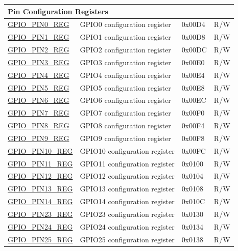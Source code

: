 \begin{longtable}{ | p{5.5cm} | p{7cm} | p{1.3cm} | p{1.9cm} | }
\multicolumn{4}{|l|}{\textbf{Pin Configuration Registers}} \\ \hline
\hyperref[regdesc:GPIOPINNREG]{GPIO\_PIN0\_REG} & GPIO0 configuration register & 0x00D4 & R/W \\ \hline
\hyperref[regdesc:GPIOPINNREG]{GPIO\_PIN1\_REG} & GPIO1 configuration register & 0x00D8 & R/W \\ \hline
\hyperref[regdesc:GPIOPINNREG]{GPIO\_PIN2\_REG} & GPIO2 configuration register & 0x00DC & R/W \\ \hline
\hyperref[regdesc:GPIOPINNREG]{GPIO\_PIN3\_REG} & GPIO3 configuration register & 0x00E0 & R/W \\ \hline
\hyperref[regdesc:GPIOPINNREG]{GPIO\_PIN4\_REG} & GPIO4 configuration register & 0x00E4 & R/W \\ \hline
\hyperref[regdesc:GPIOPINNREG]{GPIO\_PIN5\_REG} & GPIO5 configuration register & 0x00E8 & R/W \\ \hline
\hyperref[regdesc:GPIOPINNREG]{GPIO\_PIN6\_REG} & GPIO6 configuration register & 0x00EC & R/W \\ \hline
\hyperref[regdesc:GPIOPINNREG]{GPIO\_PIN7\_REG} & GPIO7 configuration register & 0x00F0 & R/W \\ \hline
\hyperref[regdesc:GPIOPINNREG]{GPIO\_PIN8\_REG} & GPIO8 configuration register & 0x00F4 & R/W \\ \hline
\hyperref[regdesc:GPIOPINNREG]{GPIO\_PIN9\_REG} & GPIO9 configuration register & 0x00F8 & R/W \\ \hline
\hyperref[regdesc:GPIOPINNREG]{GPIO\_PIN10\_REG} & GPIO10 configuration register & 0x00FC & R/W \\ \hline
\hyperref[regdesc:GPIOPINNREG]{GPIO\_PIN11\_REG} & GPIO11 configuration register & 0x0100 & R/W \\ \hline
\hyperref[regdesc:GPIOPINNREG]{GPIO\_PIN12\_REG} & GPIO12 configuration register & 0x0104 & R/W \\ \hline
\hyperref[regdesc:GPIOPINNREG]{GPIO\_PIN13\_REG} & GPIO13 configuration register & 0x0108 & R/W \\ \hline
\hyperref[regdesc:GPIOPINNREG]{GPIO\_PIN14\_REG} & GPIO14 configuration register & 0x010C & R/W \\ \hline
\hyperref[regdesc:GPIOPINNREG]{GPIO\_PIN23\_REG} & GPIO23 configuration register & 0x0130 & R/W \\ \hline
\hyperref[regdesc:GPIOPINNREG]{GPIO\_PIN24\_REG} & GPIO24 configuration register & 0x0134 & R/W \\ \hline
\hyperref[regdesc:GPIOPINNREG]{GPIO\_PIN25\_REG} & GPIO25 configuration register & 0x0138 & R/W \\ \hline

\end{longtable}
